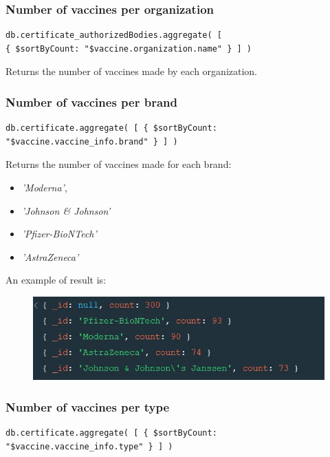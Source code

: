 \documentclass[12pt, a4paper]{article}
\begin{document}
\subsubsection{Number of vaccines per organization}
\begin{tcolorbox}[fontupper=\scriptsize]
    \begin{verbatim}
db.certificate_authorizedBodies.aggregate( [  
{ $sortByCount: "$vaccine.organization.name" } ] )
    \end{verbatim}
\end{tcolorbox}

\noindent
Returns the number of vaccines made by each organization.

\subsubsection{Number of vaccines per brand}
\begin{tcolorbox}[fontupper=\scriptsize]
    \begin{verbatim}
db.certificate.aggregate( [ { $sortByCount: "$vaccine.vaccine_info.brand" } ] )
    \end{verbatim}
\end{tcolorbox}

\noindent
Returns the number of vaccines made for each brand:
\begin{itemize}
    \item \emph{'Moderna'},
    \item \emph{'Johnson \& Johnson'}
    \item \emph{'Pfizer-BioNTech'}
    \item \emph{'AstraZeneca'}
\end{itemize} 
An example of result is:
\begin{figure}[ht]
    \centering
    \includegraphics[width=.8\linewidth]{vaccines_per_brand.jpg}
\end{figure}

\subsubsection{Number of vaccines per type}
\begin{tcolorbox}[fontupper=\scriptsize]
    \begin{verbatim}
db.certificate.aggregate( [ { $sortByCount: "$vaccine.vaccine_info.type" } ] )
    \end{verbatim}
\end{tcolorbox}
\end{document}
